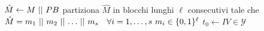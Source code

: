 \vspace{1em}
\begin{algorithm}[H]
    \SetAlgoVlined
    \SetAlgoLined
    \caption{Merkle Damgard($h,x,Q$)}
    \label{alg:merkle}
    

    $\hat{M} \gets M  \operatorname{\,||\,}  PB$\;
    partiziona $\hat{M}$ in blocchi lunghi $\ell$ consecutivi tale che\;
    $\hat{M} = m_1  \conc  m_2  \conc  \dots  \conc  m_s \quad \forall i = 1,\dots, s \ m_i \in \{0,1\}^{\ell}$\;
    $t_0 \gets IV \in \mathcal{Y}$\;

    \;
\end{algorithm}
\vspace{1em}
